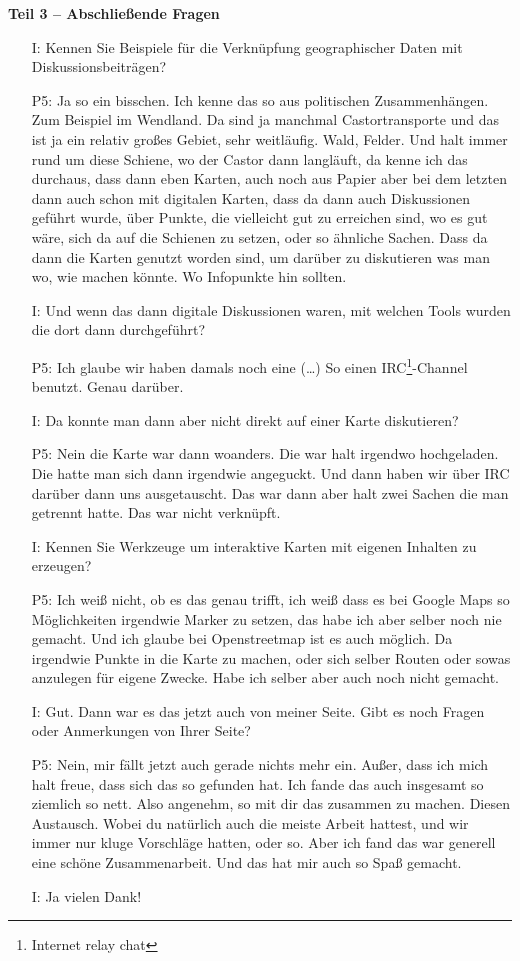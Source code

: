 \textbf{Teil 3 -- Abschlie{\ss}ende Fragen}
\begin{itemize}
    \item[I:] Kennen Sie Beispiele f{\"u}r die Verkn{\"u}pfung geographischer Daten mit Diskussionsbeitr{\"a}gen?
    \item[P5:] Ja so ein bisschen. Ich kenne das so aus politischen Zusammenh{\"a}ngen. Zum Beispiel im Wendland. Da sind ja manchmal Castortransporte und das ist ja ein relativ gro{\ss}es Gebiet, sehr weitl{\"a}ufig. Wald, Felder. Und halt immer rund um diese Schiene, wo der Castor dann langl{\"a}uft, da kenne ich das durchaus, dass dann eben Karten, auch noch aus Papier aber bei dem letzten dann auch schon mit digitalen Karten, dass da dann auch Diskussionen gef{\"u}hrt wurde, {\"u}ber Punkte, die vielleicht gut zu erreichen sind, wo es gut w{\"a}re, sich da auf die Schienen zu setzen, oder so {\"a}hnliche Sachen. Dass da dann die Karten genutzt worden sind, um dar{\"u}ber zu diskutieren was man wo, wie machen k{\"o}nnte. Wo Infopunkte hin sollten.
    \item[I:] Und wenn das dann digitale Diskussionen waren, mit welchen Tools wurden die dort dann durchgef{\"u}hrt?
    \item[P5:] Ich glaube wir haben damals noch eine (\dots) So einen IRC\footnote{Internet relay chat}-Channel benutzt. Genau dar{\"u}ber.
    \item[I:] Da konnte man dann aber nicht direkt auf einer Karte diskutieren?
    \item[P5:] Nein die Karte war dann woanders. Die war halt irgendwo hochgeladen. Die hatte man sich dann irgendwie angeguckt. Und dann haben wir {\"u}ber IRC dar{\"u}ber dann uns ausgetauscht. Das war dann aber halt zwei Sachen die man getrennt hatte. Das war nicht verkn{\"u}pft.
    \item[I:] Kennen Sie Werkzeuge um interaktive Karten mit eigenen Inhalten zu erzeugen?
    \item[P5:] Ich wei{\ss} nicht, ob es das genau trifft, ich wei{\ss} dass es bei Google Maps so M{\"o}glichkeiten irgendwie Marker zu setzen, das habe ich aber selber noch nie gemacht. Und ich glaube bei Openstreetmap ist es auch m{\"o}glich. Da irgendwie Punkte in die Karte zu machen, oder sich selber Routen oder sowas anzulegen f{\"u}r eigene Zwecke. Habe ich selber aber auch noch nicht gemacht.
    \item[I:] Gut. Dann war es das jetzt auch von meiner Seite. Gibt es noch Fragen oder Anmerkungen von Ihrer Seite?
    \item[P5:] Nein, mir f{\"a}llt jetzt auch gerade nichts mehr ein. Au{\ss}er, dass ich mich halt freue, dass sich das so gefunden hat. Ich fande das auch insgesamt so ziemlich so nett. Also angenehm, so mit dir das zusammen zu machen. Diesen Austausch. Wobei du nat{\"u}rlich auch die meiste Arbeit hattest, und wir immer nur kluge Vorschl{\"a}ge hatten, oder so. Aber ich fand das war generell eine sch{\"o}ne Zusammenarbeit. Und das hat mir auch so Spa{\ss} gemacht.
    \item[I:] Ja vielen Dank!
\end{itemize}